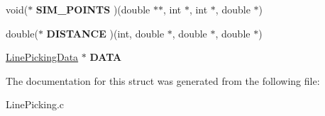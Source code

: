 \begin{DoxyCompactItemize}
\item 
\hypertarget{struct_line_picking_rec_a0a52fb5ad10a7894ccfea724e76d2b87}{void($\ast$ {\bfseries S\-I\-M\-\_\-\-P\-O\-I\-N\-T\-S} )(double $\ast$$\ast$, int $\ast$, int $\ast$, double $\ast$)}\label{struct_line_picking_rec_a0a52fb5ad10a7894ccfea724e76d2b87}

\item 
\hypertarget{struct_line_picking_rec_ac7fa55afba62f31918eed103153e582e}{double($\ast$ {\bfseries D\-I\-S\-T\-A\-N\-C\-E} )(int, double $\ast$, double $\ast$, double $\ast$)}\label{struct_line_picking_rec_ac7fa55afba62f31918eed103153e582e}

\item 
\hypertarget{struct_line_picking_rec_abe5b63d6b58ae9d52a9c7b827375641e}{\hyperlink{struct_line_picking_data}{Line\-Picking\-Data} $\ast$ {\bfseries D\-A\-T\-A}}\label{struct_line_picking_rec_abe5b63d6b58ae9d52a9c7b827375641e}

\end{DoxyCompactItemize}


The documentation for this struct was generated from the following file\-:\begin{DoxyCompactItemize}
\item 
Line\-Picking.\-c\end{DoxyCompactItemize}
